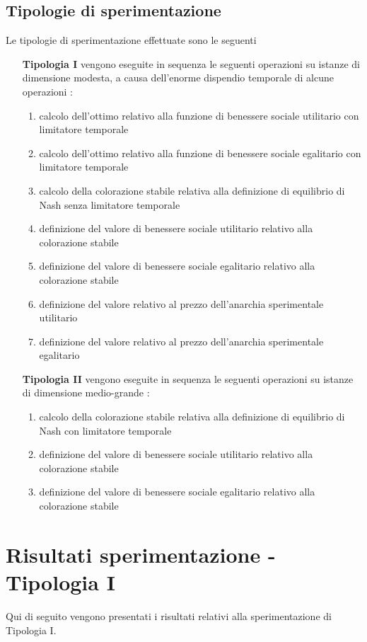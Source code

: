 \subsection{Tipologie di sperimentazione}
\justify
Le tipologie di sperimentazione effettuate sono le seguenti

\begin{itemize}
	\item [\textbf{Tipologia I}] vengono eseguite in sequenza le seguenti operazioni su istanze di dimensione modesta, a causa dell'enorme dispendio temporale di alcune operazioni :
	\begin{enumerate}
		\item calcolo dell'ottimo relativo alla funzione di benessere sociale utilitario con limitatore temporale
		\item calcolo dell'ottimo relativo alla funzione di benessere sociale egalitario con limitatore temporale
		\item calcolo della colorazione stabile relativa alla definizione di equilibrio di Nash senza limitatore temporale
		\item definizione del valore di benessere sociale utilitario relativo alla colorazione stabile
		\item definizione del valore di benessere sociale egalitario relativo alla colorazione stabile
		\item definizione del valore relativo al prezzo dell'anarchia sperimentale utilitario
		\item definizione del valore relativo al prezzo dell'anarchia sperimentale egalitario
	\end{enumerate}
	\item [\textbf{Tipologia II}] vengono eseguite in sequenza le seguenti operazioni su istanze di dimensione medio-grande :
	\begin{enumerate}
		\item calcolo della colorazione stabile relativa alla definizione di equilibrio di Nash con limitatore temporale
		\item definizione del valore di benessere sociale utilitario relativo alla colorazione stabile
		\item definizione del valore di benessere sociale egalitario relativo alla colorazione stabile
	\end{enumerate}
\end{itemize}

\section{Risultati sperimentazione - Tipologia I}
\justify
Qui di seguito vengono presentati i risultati relativi alla sperimentazione di Tipologia I.\\

